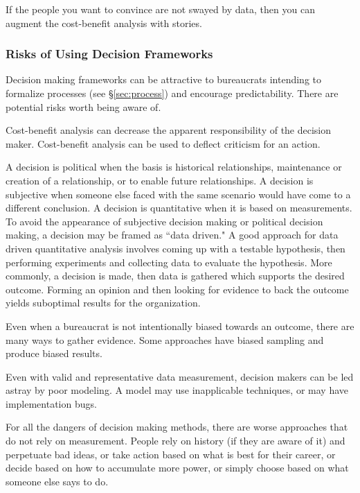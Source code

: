 If the people you want to convince are not swayed by data, then you can augment the cost-benefit analysis with stories. 

\subsubsection{Risks of Using Decision Frameworks}

Decision making frameworks can be attractive to bureaucrats intending to formalize processes (see \S\ref{sec:process}) and encourage predictability. There are potential risks worth being aware of. 

Cost-benefit analysis can decrease the apparent responsibility of the decision maker. Cost-benefit analysis can be used to deflect criticism for an action. 

A decision is political when the basis is historical relationships, maintenance or creation of a relationship, or to enable future relationships. A decision is subjective when someone else faced with the same scenario would have come to a different conclusion.
A decision is quantitative when it is based on measurements. To avoid the appearance of subjective decision making or political decision making, a decision may be framed as ``data driven." 
A good approach for data driven quantitative analysis involves coming up with a testable hypothesis, then performing experiments and collecting data to evaluate the hypothesis. More commonly, a decision is made, then data is gathered which supports the desired outcome. Forming an opinion and then looking for evidence to back the outcome yields suboptimal results for the organization.

Even when a bureaucrat is not intentionally biased towards an outcome, there are many ways to gather evidence. Some approaches have biased sampling and produce biased results.

Even with valid and representative data measurement, decision makers can be led astray by poor modeling. A model may use inapplicable techniques, or may have implementation bugs.

For all the dangers of decision making methods, there are worse approaches that do not rely on measurement. People rely on history (if they are aware of it) and perpetuate bad ideas, or take action based on what is best for their career, or decide based on how to accumulate more power, or simply choose based on what someone else says to do.  

